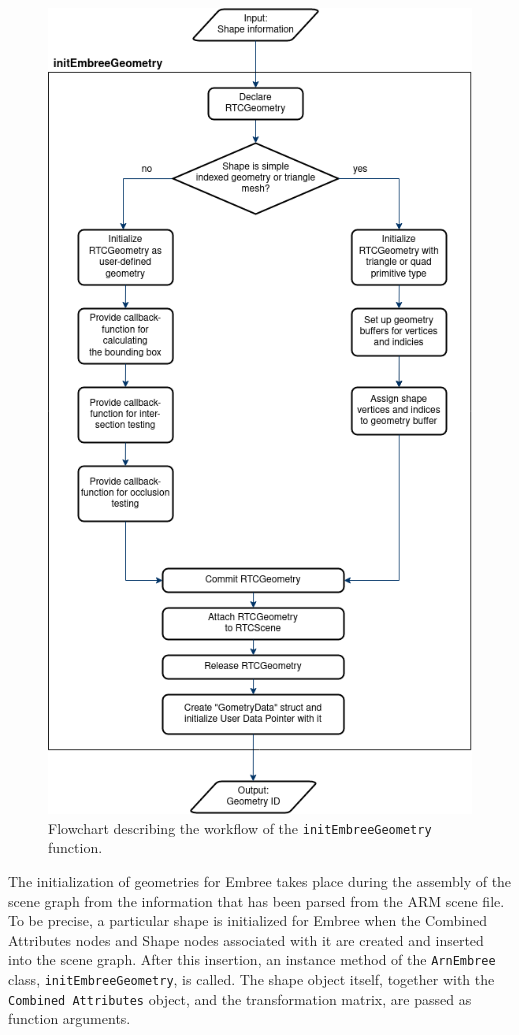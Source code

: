 \begin{figure} 
	\centering
	\includegraphics[width=.75\linewidth]{img/3 approach/shape_init_diagram.png}
	\caption{Flowchart describing the workflow of the \texttt{initEmbreeGeometry} function.}
	\label{fig:init_chart}
\end{figure}

The initialization of geometries for Embree takes place during the assembly of the scene graph from the information that has been parsed from the ARM scene file. To be precise, a particular shape is initialized for Embree when the Combined Attributes nodes and Shape nodes associated with it are created and inserted into the scene graph. After this insertion, an instance method of the \texttt{ArnEmbree} class, \texttt{initEmbreeGeometry}, is called. The shape object itself, together with the \texttt{Combined Attributes} object, and the transformation matrix, are passed as function arguments. 
\\

